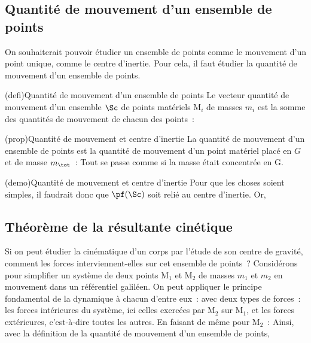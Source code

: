 \documentclass[../../main/main.tex]{subfiles}
\begin{document}
\subsection{Quantité de mouvement d'un ensemble de points}

On souhaiterait pouvoir étudier un ensemble de points comme le mouvement d'un
point unique, comme le centre d'inertie. Pour cela, il faut étudier la quantité
de mouvement d'un ensemble de points.

\begin{tcb*}(defi){Quantité de mouvement d'un ensemble de points}
	Le vecteur quantité de mouvement d'un ensemble $\Sc$ de points matériels
	M$_i$ de masses $m_i$ est la somme des quantités de mouvement de chacun des
	points~:
	\psw{
		\[
			\boxed{\pf(\Sc) = \sum_i m_i \vf(\Mr_i)}
		\]
	}
\end{tcb*}

\begin{tcb*}(prop){Quantité de mouvement et centre d'inertie}
	La quantité de mouvement d'un ensemble de points est la quantité de
	mouvement d'un point matériel placé en $G$ et de masse $m_{\tot}$~:
	\psw{
		\[
			\boxed{\pf (\Sc) = m_{\tot}\vf (\Gr)}
		\]
	}
	Tout se passe comme si la masse était concentrée en G.
\end{tcb*}

\begin{tcb*}(demo){Quantité de mouvement et centre d'inertie}
	Pour que les choses soient simples, il faudrait donc que $\pf(\Sc)$ soit relié
	au centre d'inertie. Or,
	\psw{
		\[
			\vf(\Gr) = \dv{\vv{\rm OG}}{t} = \frac{1}{m_{\tot}}
			\underbracket[1pt]{\sum_i m_i \dv{{\OM}_i}{t}}_{\pf(\Sc)}
			\Lra
			\boxed{\pf(\Sc) = m_{\tot}\vf(\Gr)}
		\]
	}
\end{tcb*}

\subsection{Théorème de la résultante cinétique}
Si on peut étudier la cinématique d'un corps par l'étude de son centre de
gravité, comment les forces interviennent-elles sur cet ensemble de points~?
Considérons pour simplifier un système de deux points M$_1$ et M$_2$ de masses
$m_1$ et $m_2$ en mouvement dans un référentiel galiléen. On peut appliquer le
principe fondamental de la dynamique à chacun d'entre eux~:
\psw{
	\[\dv{\pf(\Mr_1)}{t} = \Ff_{\Mr_2\ra\Mr_1} + \Ff_{\ext\ra\Mr_1}\]
}
avec deux types de forces~: les forces intérieures du système, ici celles
exercées par M$_2$ sur M$_1$, et les forces extérieures, c'est-à-dire toutes les
autres. En faisant de même pour M$_2$~:
\psw{
	\[\dv{\pf(\Mr_2)}{t} = \Ff_{\Mr_1\ra\Mr_2} + \Ff_{\ext\ra\Mr_2}\]
}
Ainsi, avec la définition de la quantité de mouvement d'un ensemble de points,
\psw{
	\[
		\dv{\pf(\Sc)}{t} =
		\underbracket[1pt]{\Ff_{\Mr_1\ra\Mr_2}+\Ff_{\Mr_2\ra\Mr_1}}_{= \of
			\text{ d'après la 3ème loi}} + \Ff_{\ext\ra\Mr_1} + \Ff_{\ext\ra\Mr_2}\]
}
\end{document}
